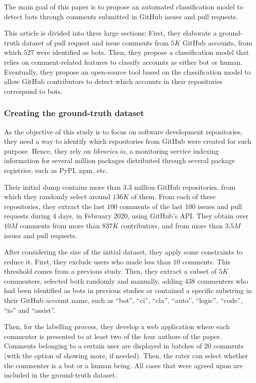\documentclass[a4paper, 12pt]{book}
\begin{document}
The main goal of this paper is to propose an automated classification model to detect bots through comments submitted in GitHub issues and pull requests.

This article is divided into three large sections: First, they elaborate a ground-truth dataset of pull request and issue comments from $5K$ GitHub accounts, from which $527$ were identified as bots. Then, they propose a classification model that relies on comment-related features to classify accounts as either bot or human. Eventually, they propose an open-source tool based on the classification model to allow GitHub contributors to detect which accounts in their repositories correspond to bots.

\subsubsection{Creating the ground-truth dataset}
\label{sssec:golzadeh-dataset}

As the objective of this study is to focus on software development repositories, they need a way to identify which repositories from GitHub were created for such purpose. Hence, they rely on \textit{libraries.io}, a monitoring service indexing information for several million packages distributed through several package registries, such as PyPI, npm, etc. 

Their initial dump contains more than $3.3$ million GitHub repositories, from which they randomly select around $136K$ of them. From each of these repositories, they extract the last $100$ comments of the last $100$ issues and pull requests during $4$ days, in February 2020, using GitHub's API. They obtain over $10M$ comments from more than $837K$ contributors, and from more than $3.5M$ issues and pull requests.

After considering the size of the initial dataset, they apply some constraints to reduce it. First, they exclude users who made less than $10$ comments. This threshold comes from a previous study. Then, they extract a subset of $5K$ commenters, selected both randomly and manually, adding $438$ commenters who had been identified as bots in previous studies or contained a specific substring in their GitHub account name, such as ``bot'', ``ci'', ``cla'', ``auto'', ``logic'', ``code'', ``io'' and ``assist''.

Then, for the labelling process, they develop a web application where each commenter is presented to at least two of the four authors of the paper. Comments belonging to a certain user are displayed in batches of $20$ comments (with the option of showing more, if needed). Then, the rater can select whether the commenter is a bot or a human being. All cases that were agreed upon are included in the ground-truth dataset.
\end{document}
